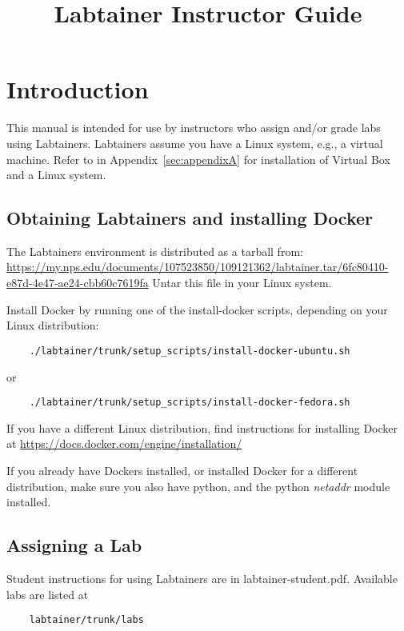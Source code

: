 \documentclass[12pt]{article}
\begin{document}
\title {Labtainer Instructor Guide\vspace{-4ex}}
\maketitle

\section {Introduction}
This manual is intended for use by instructors who assign and/or grade
labs using Labtainers.
Labtainers assume you have a Linux system, e.g., a virtual machine.  Refer to
in Appendix~\ref{sec:appendixA} for installation of Virtual Box and a Linux system.

\subsection{Obtaining Labtainers and installing Docker}
The Labtainers environment is distributed as a tarball from:
\url{https://my.nps.edu/documents/107523850/109121362/labtainer.tar/6fc80410-e87d-4e47-ae24-cbb60c7619fa}
Untar this file in your Linux system.

Install Docker by running one of the install-docker scripts, depending on your Linux
distribution:
\begin{verbatim}
    ./labtainer/trunk/setup_scripts/install-docker-ubuntu.sh
\end{verbatim}
\noindent or 
\begin{verbatim}
    ./labtainer/trunk/setup_scripts/install-docker-fedora.sh
\end{verbatim}
If you have a different Linux distribution, find instructions for installing Docker at
\url{https://docs.docker.com/engine/installation/}

If you already have Dockers installed, or installed Docker for a different distribution,
make sure you also have python, and
the python \textit{netaddr} module installed.

\subsection{Assigning a Lab}
Student instructions for using Labtainers are in labtainer-student.pdf.  Available labs are
listed at 
\begin{verbatim}
    labtainer/trunk/labs
\end{verbatim}
\end{document}
